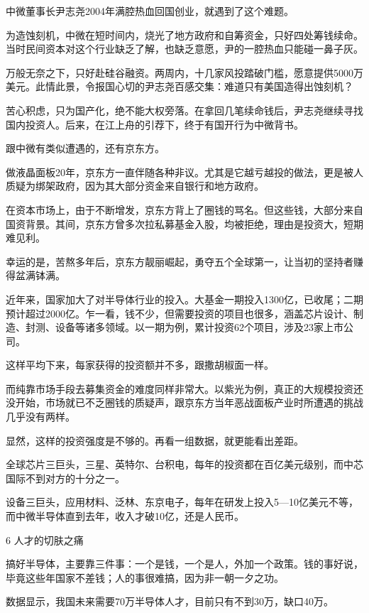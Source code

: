 \documentclass[utf8]{book}
\begin{document}
	中微董事长尹志尧2004年满腔热血回国创业，就遇到了这个难题。

	为造蚀刻机，中微在短时间内，烧光了地方政府和自筹资金，只好四处筹钱续命。当时民间资本对这个行业缺乏了解，也缺乏意愿，尹的一腔热血只能碰一鼻子灰。

	万般无奈之下，只好赴硅谷融资。两周内，十几家风投踏破门槛，愿意提供5000万美元。此情此景，令报国心切的尹志尧百感交集：难道只有美国造得出蚀刻机？

	苦心积虑，只为国产化，绝不能大权旁落。在拿回几笔续命钱后，尹志尧继续寻找国内投资人。后来，在江上舟的引荐下，终于有国开行为中微背书。

	跟中微有类似遭遇的，还有京东方。

	做液晶面板20年，京东方一直伴随各种非议。尤其是它越亏越投的做法，更是被人质疑为绑架政府，因为其大部分资金来自银行和地方政府。

	在资本市场上，由于不断增发，京东方背上了圈钱的骂名。但这些钱，大部分来自国资背景。其间，京东方曾多次拉私募基金入股，均被拒绝，理由是投资大，短期难见利。

	幸运的是，苦熬多年后，京东方靓丽崛起，勇夺五个全球第一，让当初的坚持者赚得盆满钵满。

	近年来，国家加大了对半导体行业的投入。大基金一期投入1300亿，已收尾；二期预计超过2000亿。乍一看，钱不少，但需要投资的项目也很多，涵盖芯片设计、制造、封测、设备等诸多领域。以一期为例，累计投资62个项目，涉及23家上市公司。

	这样平均下来，每家获得的投资额并不多，跟撒胡椒面一样。

	而纯靠市场手段去募集资金的难度同样非常大。以紫光为例，真正的大规模投资还没开始，市场就已不乏圈钱的质疑声，跟京东方当年恶战面板产业时所遭遇的挑战几乎没有两样。

	显然，这样的投资强度是不够的。再看一组数据，就更能看出差距。

	全球芯片三巨头，三星、英特尔、台积电，每年的投资都在百亿美元级别，而中芯国际不到对方的十分之一。

	设备三巨头，应用材料、泛林、东京电子，每年在研发上投入5—10亿美元不等，而中微半导体直到去年，收入才破10亿，还是人民币。


	\begin{flushleft}
		{\Large 6 人才的切肤之痛}
	\end{flushleft}


	搞好半导体，主要靠三件事：一个是钱，一个是人，外加一个政策。钱的事好说，毕竟这些年国家不差钱；人的事很难搞，因为非一朝一夕之功。
	
	数据显示，我国未来需要70万半导体人才，目前只有不到30万，缺口40万。
	
\end{document}
